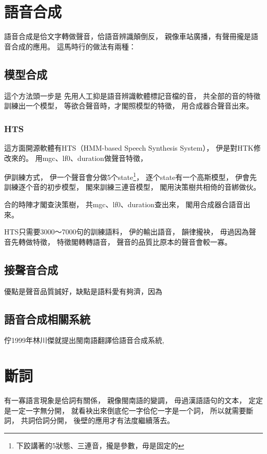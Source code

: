 
\section{語音合成}
\label{節：語音合成}
語音合成是佮文字轉做聲音，佮語音辨識顛倒反，
親像車站廣播，有聲冊攏是語音合成的應用。
這馬時行的做法有兩種：

\subsection{模型合成}
\label{小節：模型合成}
這个方法頭一步是
先用人工抑是語音辨識軟體標記音檔的音，
共全部的音的特徵訓練出一个模型，
等欲合聲音時，才閣照模型的特徵，
用合成器合聲音出來。


\subsubsection{HTS}
\label{小節：HTS}
這方面開源軟體有HTS（HMM-based Speech Synthesis System）\cite{HTS網頁}，
伊是對HTK修改來的。
用mgc、lf0、duration做聲音特徵，

伊訓練方式，
伊一个聲音會分做5个state\footnote{下跤講著的5狀態、三連音，攏是參數，毋是固定的}，
逐个state有一个高斯模型，
伊會先訓練逐个音的初步模型，
閣來訓練三連音模型，
閣用決策樹共相倚的音綁做伙。

合的時陣才閣查決策樹，
共mgc、lf0、duration查出來，
閣用合成器合語音出來。

HTS只需要3000～7000句的訓練語料，
伊的輸出語音，
韻律攏袂，
毋過因為聲音先轉做特徵，
特徵閣轉轉語音，
聲音的品質比原本的聲音會較一寡。


\subsection{接聲音合成}
\label{小節：接聲音合成}

優點是聲音品質誠好，缺點是語料愛有夠濟，因為

\subsection{語音合成相關系統}
\label{小節：語音合成相關系統}
佇1999年林川傑就提出閩南語翻譯佮語音合成系統\cite{中文到閩南語之線上翻譯及閩南語之語音合成},

\section{斷詞}
\label{節：斷詞}
有一寡語言現象是佮詞有關係，
親像閩南語的變調，
毋過漢語語句的文本，
定定是一定一字無分開，
就看袂出來倒底佗一字佮佗一字是一个詞，
所以就需要斷詞，
共詞佮詞分開，
後壁的應用才有法度繼續落去。



